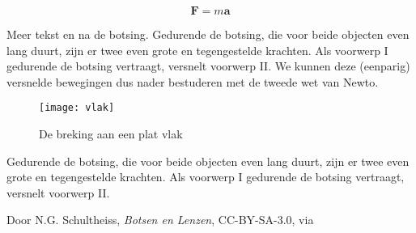 \begin{equation}
    \mathbf{F}=m\mathbf{a}
\end{equation}

Meer tekst en na de botsing. Gedurende de botsing, die voor beide
objecten even lang duurt, zijn er twee even grote en tegengestelde
krachten. Als voorwerp I gedurende de botsing vertraagt, versnelt
voorwerp II. We kunnen deze (eenparig) versnelde bewegingen dus nader
bestuderen met de tweede wet van Newto.

\begin{figure}[H]
    \centering
    \texttt{[image: vlak]}
    \caption{De breking aan een plat vlak}\label{fig:vlak}
\end{figure}

Gedurende de botsing, die voor beide objecten even lang duurt, zijn er
twee even grote en tegengestelde krachten. Als voorwerp I gedurende de
botsing vertraagt, versnelt voorwerp II.

\begin{thebibliography}{9}
        Door N.G. Schultheiss, \emph{Botsen en Lenzen}, CC-BY-SA-3.0, via \hisparc
\end{thebibliography}


